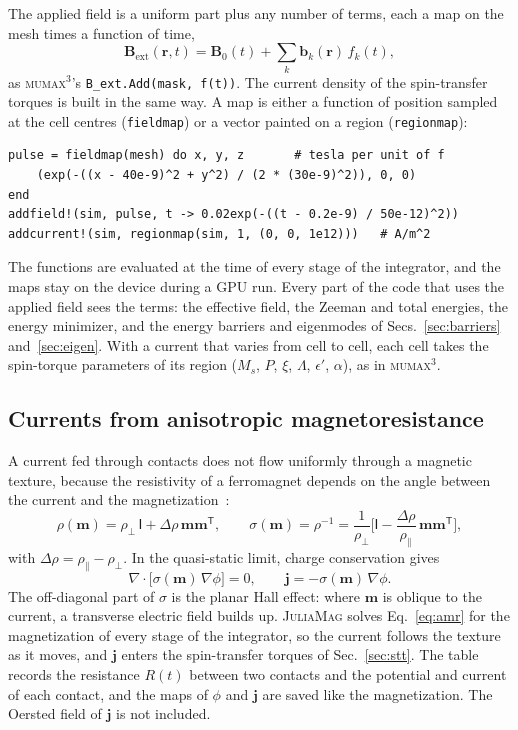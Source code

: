\documentclass{article}      %
\newcommand{\JuliaMag}{\textsc{JuliaMag}}
\newcommand{\mumax}{\textsc{mumax}$^3$}
\newcommand{\vm}{\bm{m}}
\newcommand{\vB}{\bm{B}}
\begin{document}
The applied field is a uniform part plus any number of terms, each a map on the mesh
times a function of time,
%
\begin{equation}
  \vB_{\mathrm{ext}}(\bm{r},t) = \vB_0(t) + \sum_k \bm{b}_k(\bm{r})\,f_k(t),
  \label{eq:bext}
\end{equation}
%
as \mumax's \texttt{B\_ext.Add(mask, f(t))}. The current density of the
spin-transfer torques is built in the same way. A map is either a function of
position sampled at the cell centres (\texttt{fieldmap}) or a vector painted on a
region (\texttt{regionmap}):
%
\begin{lstlisting}
pulse = fieldmap(mesh) do x, y, z       # tesla per unit of f
    (exp(-((x - 40e-9)^2 + y^2) / (2 * (30e-9)^2)), 0, 0)
end
addfield!(sim, pulse, t -> 0.02exp(-((t - 0.2e-9) / 50e-12)^2))
addcurrent!(sim, regionmap(sim, 1, (0, 0, 1e12)))   # A/m^2
\end{lstlisting}
%
The functions are evaluated at the time of every stage of the integrator, and the
maps stay on the device during a GPU run. Every part of the code that uses the
applied field sees the terms: the effective field, the Zeeman and total energies,
the energy minimizer, and the energy barriers and eigenmodes of
Secs.~\ref{sec:barriers} and~\ref{sec:eigen}. With a current that varies from
cell to cell, each cell takes the spin-torque parameters of its region ($M_s$,
$P$, $\xi$, $\Lambda$, $\epsilon'$, $\alpha$), as in \mumax.

\subsection{Currents from anisotropic magnetoresistance}
\label{sec:amr}

A current fed through contacts does not flow uniformly through a magnetic texture,
because the resistivity of a ferromagnet depends on the angle between the current
and the magnetization~\cite{mcguire1975}:
%
\begin{equation}
  \rho(\vm) = \rho_\perp\,\mathsf{I} + \Delta\rho\,\vm\vm^{\mathsf{T}},
  \qquad
  \sigma(\vm) = \rho^{-1}
  = \frac{1}{\rho_\perp}\Big[\mathsf{I} - \frac{\Delta\rho}{\rho_\parallel}\,\vm\vm^{\mathsf{T}}\Big],
  \label{eq:amrsigma}
\end{equation}
%
with $\Delta\rho = \rho_\parallel-\rho_\perp$. In the quasi-static limit, charge
conservation gives
%
\begin{equation}
  \nabla\cdot\big[\sigma(\vm)\,\nabla\phi\big] = 0,
  \qquad
  \bm{j} = -\sigma(\vm)\,\nabla\phi .
  \label{eq:amr}
\end{equation}
%
The off-diagonal part of $\sigma$ is the planar Hall effect: where $\vm$ is oblique
to the current, a transverse electric field builds up. \JuliaMag{} solves
Eq.~\eqref{eq:amr} for the magnetization of every stage of the integrator, so the
current follows the texture as it moves, and $\bm{j}$ enters the spin-transfer
torques of Sec.~\ref{sec:stt}. The table records the resistance $R(t)$ between two
contacts and the potential and current of each contact, and the maps of $\phi$ and
$\bm{j}$ are saved like the magnetization. The Oersted field of $\bm{j}$ is not
included.
\end{document}
